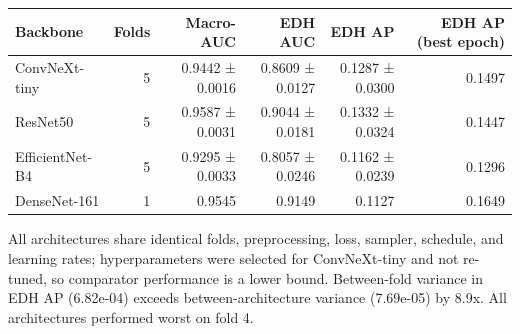 \begin{tabular}{lrrrrr}
\toprule
Backbone & Folds & Macro-AUC & EDH AUC & EDH AP & EDH AP (best epoch) \\
\midrule
ConvNeXt-tiny & 5 & 0.9442 ± 0.0016 & 0.8609 ± 0.0127 & 0.1287 ± 0.0300 & 0.1497 \\
ResNet50 & 5 & 0.9587 ± 0.0031 & 0.9044 ± 0.0181 & 0.1332 ± 0.0324 & 0.1447 \\
EfficientNet-B4 & 5 & 0.9295 ± 0.0033 & 0.8057 ± 0.0246 & 0.1162 ± 0.0239 & 0.1296 \\
DenseNet-161 & 1 & 0.9545 & 0.9149 & 0.1127 & 0.1649 \\
\bottomrule
\end{tabular}

\vspace{2pt}
{\footnotesize All architectures share identical folds, preprocessing, loss, sampler, schedule, and learning rates; hyperparameters were selected for ConvNeXt-tiny and not re-tuned, so comparator performance is a lower bound. Between-fold variance in EDH AP (6.82e-04) exceeds between-architecture variance (7.69e-05) by 8.9x. All architectures performed worst on fold 4.}
